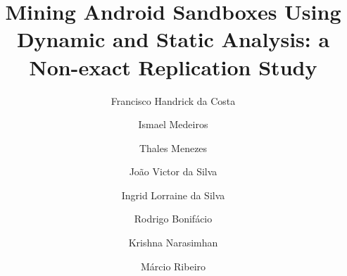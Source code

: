 \documentclass[review]{elsarticle}
\begin{document}
\begin{frontmatter}
\title{Mining Android Sandboxes Using Dynamic and Static Analysis: a Non-exact Replication Study}


\author[1]{Francisco Handrick da Costa}
\author[1]{Ismael Medeiros}
\author[1]{Thales Menezes}
\author[1]{Jo\~{a}o Victor da Silva}
\author[1]{Ingrid Lorraine da Silva}
\author[1]{Rodrigo Bonif\'{a}cio}
\author[2]{Krishna Narasimhan}
\author[3]{M\'{a}rcio Ribeiro}

\address[1]{Computer Science Department, University of Bras\'{i}lia, Brazil}
\address[2]{Software Technology Group, TU Darmstadt, Germany}
\address[3]{Institute of Computing, Federal University of Alagoas, Brazil}




\end{frontmatter}




%


%





% 
\end{document}
